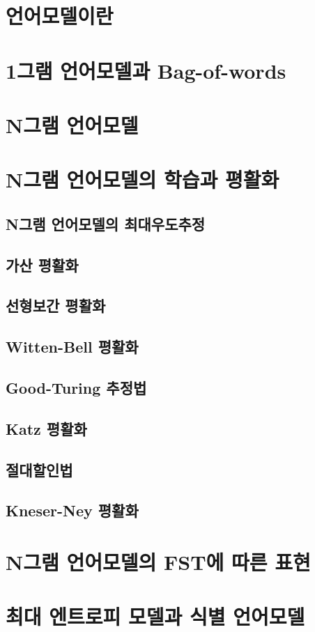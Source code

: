 \documentclass[../main.tex]{subfiles}
\begin{document}
\section{언어모델이란}
\section{1그램 언어모델과 Bag-of-words}
\section{N그램 언어모델}
\section{N그램 언어모델의 학습과 평활화}
\subsection{N그램 언어모델의 최대우도추정}
\subsection{가산 평활화}
\subsection{선형보간 평활화}
\subsection{Witten-Bell 평활화}
\subsection{Good-Turing 추정법}
\subsection{Katz 평활화}
\subsection{절대할인법}
\subsection{Kneser-Ney 평활화}

\section{N그램 언어모델의 FST에 따른 표현}
\label{sec:N-gram-FST}
\section{최대 엔트로피 모델과 식별 언어모델}
\end{document}
